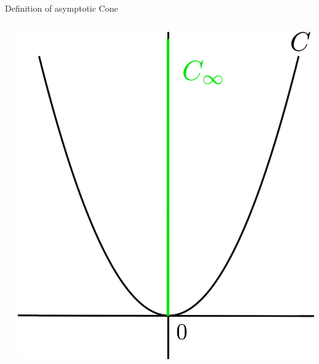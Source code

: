 \documentclass[aspectratio=169, dvipdfmx, 11pt]{beamer}
\begin{document}
\begin{frame}{Definition of asymptotic Cone}
\begin{columns}
\begin{column}{0.32\textwidth}
    \end{column}
    \pause
    \begin{column}{0.32\textwidth}
    \centering
    \includegraphics[keepaspectratio, scale=0.032]{figures/asymptotic_cone_example/asymptotic_cone_of_graph_of_x*x.eps}
    \end{column}
  \end{columns}
\end{frame}
\end{document}
